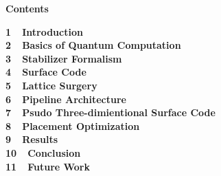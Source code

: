 \documentclass[a4paper,11pt]{ltjsarticle}
\begin{document}
\huge\bfseries{Contents}

\vspace{10pt}
\Large\bfseries{
1\ \ Introduction\\
2\ \ Basics of Quantum Computation\\
3\ \ Stabilizer Formalism\\
4\ \ Surface Code\\
5\ \ Lattice Surgery\\
6\ \ Pipeline Architecture\\
7\ \ Psudo Three-dimientional Surface Code\\
8\ \ Placement Optimization\\
9\ \ Results\\
10\ \ Conclusion\\
11\ \ Future Work\\
}
\end{document}
